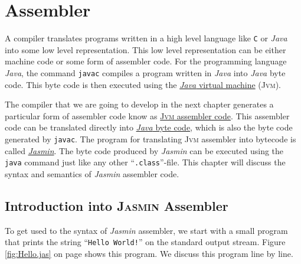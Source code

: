 \chapter{Assembler}
A compiler translates programs written in a high level language like \texttt{C} or
\textsl{Java} into some low level representation.  This low level representation can be
either machine code or some form of assembler code.  For the programming language \textsl{Java},
the command \texttt{javac} compiles a program written in \textsl{Java} into
\textsl{Java} byte code.  This byte code is then executed using the 
\href{http://en.wikipedia.org/wiki/Java_virtual_machine}{\textsl{Java} virtual machine}
(\textsc{Jvm}).

The compiler that we are going to
develop in the next chapter generates a particular form of assembler code know as
\href{http://jasmin.sourceforge.net}{\textsc{Jvm} assembler code}.
This assembler code can be translated directly into
\href{http://en.wikipedia.org/wiki/Java_bytecode}{\textsl{Java} byte code}, which 
is also the byte code generated by \texttt{javac}.  The program for translating \textsc{Jvm}
assembler into bytecode is called \href{http://jasmin.sourceforge.net}{\textsl{Jasmin}}.
The  byte code produced by \textsl{Jasmin} can be executed using the
\texttt{java} command just like any other ``\texttt{.class}''-file.  
This chapter will discuss the syntax and
semantics of \textsl{Jasmin} assembler code.



\section{Introduction into \textsc{Jasmin} Assembler}
To get used to the syntax of \textsl{Jasmin} assembler, we start with a small program that prints the
string ``\texttt{Hello World!}'' on the standard output stream.  Figure \ref{fig:Hello.jas} on page
\pageref{fig:Hello.jas} shows this program. We discuss this program line by line.

